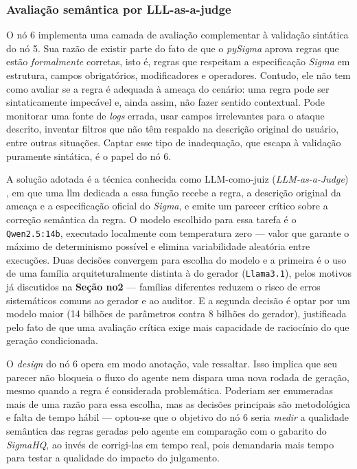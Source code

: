 \subsubsection{Avaliação semântica por LLL-as-a-judge}

O nó 6 implementa uma camada de avaliação complementar à validação sintática do nó 5.
Sua razão de existir parte do fato de que o \textit{pySigma} aprova regras que estão \textit{formalmente} corretas, isto é, regras que respeitam a especificação \textit{Sigma} em estrutura, campos obrigatórios, modificadores e operadores. 
Contudo, ele não tem como avaliar se a regra é adequada à ameaça do cenário: uma regra pode ser sintaticamente impecável e, ainda assim, não fazer sentido contextual. 
Pode monitorar uma fonte de \textit{logs} errada, usar campos irrelevantes para o ataque descrito, inventar filtros que não têm respaldo na descrição original do usuário, entre outras situações. 
Captar esse tipo de inadequação, que escapa à validação puramente sintática, é o papel do nó 6.

A solução adotada é a técnica conhecida como LLM-como-juiz (\textit{LLM-as-a-Judge}) \cite{zheng2023judging}, em que uma \gls{llm} dedicada a essa função recebe a regra, a descrição original da ameaça e a especificação oficial do \textit{Sigma}, e emite um parecer crítico sobre a correção semântica da regra. 
O modelo escolhido para essa tarefa é o \texttt{Qwen2.5:14b}, executado localmente com temperatura zero --- valor que garante o máximo de determinismo possível e elimina variabilidade aleatória entre execuções. 
Duas decisões convergem para escolha do modelo e a primeira é o uso de uma família arquiteturalmente distinta à do gerador (\texttt{Llama3.1}), pelos motivos já discutidos na \textbf{Seção no2} --- famílias diferentes reduzem o risco de erros sistemáticos comuns ao gerador e ao auditor. 
E a segunda decisão é optar por um modelo maior (14 bilhões de parâmetros contra 8 bilhões do gerador), justificada pelo fato de que uma avaliação crítica exige mais capacidade de raciocínio do que geração condicionada.

O \textit{design} do nó 6 opera em modo anotação, vale ressaltar. 
Isso implica que seu parecer não bloqueia o fluxo do agente nem dispara uma nova rodada de geração, mesmo quando a regra é considerada problemática. 
Poderiam ser enumeradas mais de uma razão para essa escolha, mas as decisões principais são metodológica e falta de tempo hábil --- optou-se que o objetivo do nó 6 seria \textit{medir} a qualidade semântica das regras geradas pelo agente em comparação com o gabarito do \textit{SigmaHQ}, ao invés de corrigi-las em tempo real, pois demandaria mais tempo para testar a qualidade do impacto do julgamento. 

